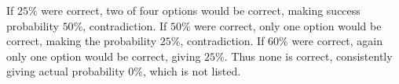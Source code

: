 If $25\%$ were correct, two of four options would be correct, making success probability $50\%$, contradiction. If $50\%$ were correct, only one option would be correct, making the probability $25\%$, contradiction. If $60\%$ were correct, again only one option would be correct, giving $25\%$. Thus none is correct, consistently giving actual probability $\boxed{0\%}$, which is not listed.
